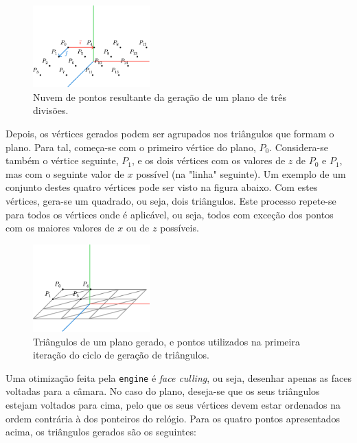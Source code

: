 \documentclass[12pt, a4paper]{article}
\begin{document}
\begin{figure}[H]
    \centering
    \includegraphics[width=0.4\textwidth]{res/figures/PlanePoints.pdf}
    \caption{Nuvem de pontos resultante da geração de um plano de três divisões.}
\end{figure}

Depois, os vértices gerados podem ser agrupados nos triângulos que formam o plano. Para tal,
começa-se com o primeiro vértice do plano, $P_0$. Considera-se também o vértice seguinte, $P_1$, e
os dois vértices com os valores de $z$ de $P_0$ e $P_1$, mas com o seguinte valor de $x$ possível
(na "linha"{} seguinte). Um exemplo de um conjunto destes quatro vértices pode ser visto na figura
abaixo. Com estes vértices, gera-se um quadrado, ou seja, dois triângulos. Este processo repete-se
para todos os vértices onde é aplicável, ou seja, todos com exceção dos pontos com os maiores
valores de $x$ ou de $z$ possíveis.

\begin{figure}[H]
    \centering
    \includegraphics[width=0.4\textwidth]{res/figures/PlaneTriangles.pdf}
    \caption{
        \onehalfspacing
        Triângulos de um plano gerado, e pontos utilizados na primeira iteração do ciclo de geração
        de triângulos.
    }
\end{figure}

Uma otimização feita pela \texttt{engine} é \emph{face culling}, ou seja, desenhar apenas as faces
voltadas para a câmara. No caso do plano, deseja-se que os seus triângulos estejam voltados para
cima, pelo que os seus vértices devem estar ordenados na ordem contrária à dos ponteiros do
relógio. Para os quatro pontos apresentados acima, os triângulos gerados são os seguintes:
\end{document}
